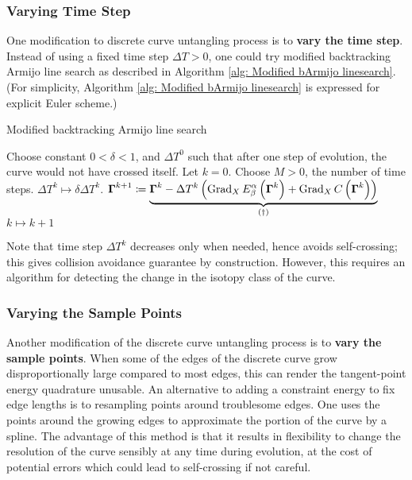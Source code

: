 \documentclass[../dissertation.tex]{subfiles}
\begin{document}
\subsubsection{Varying Time Step}
One modification to discrete curve untangling process is to \textbf{vary the time step}.
Instead of using a fixed time step $\Delta T > 0$, one could try modified backtracking Armijo line search\cite{doi:10.1137/1.9781611971200.ch6} as described in Algorithm \ref{alg: Modified bArmijo linesearch}.
(For simplicity, Algorithm \ref{alg: Modified bArmijo linesearch} is expressed for explicit Euler scheme.)
\begin{algorithm}[tbp]
    \caption{Modified backtracking Armijo line search}
    \label{alg: Modified bArmijo linesearch}
    \begin{algorithmic}
        \State Choose constant $0 < \delta < 1$, and $\Delta T^0$ such that after one step of evolution, the curve would not have crossed itself.
        \State Let $k = 0$.
        \State Choose $M > 0$, the number of time steps.
            \State $\Delta T^k \mapsto \delta \Delta T^k$.
            \Else
            \State $\boldsymbol{\Gamma}^{k+1} \coloneqq \underbrace{\boldsymbol{\Gamma}^k - \Delta T^k \left( \operatorname{Grad}_X E_{\beta}^{\alpha} \left( \boldsymbol{\Gamma}^k \right) + \operatorname{Grad}_X C \left( \boldsymbol{\Gamma}^k \right)\right)}_{(\dag)}$
            \State $k \mapsto k + 1$
            \EndIf
        \EndWhile
    \end{algorithmic}
\end{algorithm}
Note that time step $\Delta T^k$ decreases only when needed, hence avoids self-crossing;
this gives collision avoidance guarantee by construction\cite{YSC2021}.
However, this requires an algorithm for detecting the change in the isotopy class of the curve.

\subsubsection{Varying the Sample Points}
Another modification of the discrete curve untangling process is to \textbf{vary the sample points}.
When some of the edges of the discrete curve grow disproportionally large compared to most edges,
this can render the tangent-point energy quadrature unusable.
An alternative to adding a constraint energy to fix edge lengths is to resampling points around troublesome edges.
One uses the points around the growing edges to approximate the portion of the curve by a spline. The advantage of this method is that it results in flexibility to change the resolution of the curve sensibly at any time during evolution, at the cost of potential errors which could lead to self-crossing if not careful.
\end{document}
